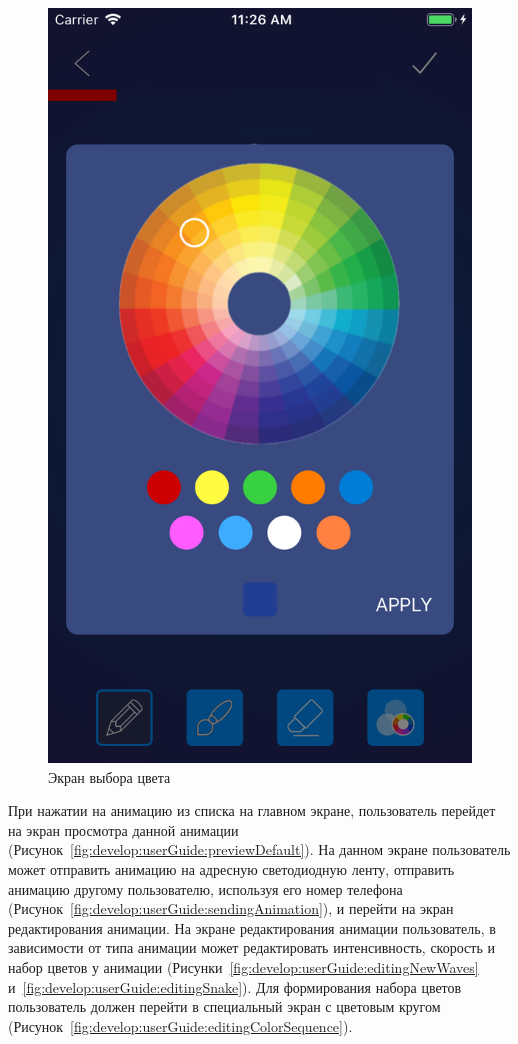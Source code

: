 \begin{figure}[H]
\centering
	\includegraphics[scale=0.2]{figures/userGuide/colorPicker.png}
	\caption{Экран выбора цвета}
	\label{fig:develop:userGuide:colorPicker}
\end{figure}
\vspace*{-1pt}
При нажатии на анимацию из списка на главном экране, пользователь перейдет на экран просмотра данной анимации (Рисунок~\ref{fig:develop:userGuide:previewDefault}). На данном экране пользователь может отправить анимацию на адресную светодиодную ленту, отправить анимацию другому пользователю, используя его номер телефона (Рисунок~\ref{fig:develop:userGuide:sendingAnimation}), и перейти на экран редактирования анимации. На экране редактирования анимации пользователь, в зависимости от типа анимации может редактировать интенсивность, скорость и набор цветов у анимации (Рисунки~\ref{fig:develop:userGuide:editingNewWaves} и~\ref{fig:develop:userGuide:editingSnake}). Для формирования набора цветов пользователь должен перейти в специальный экран с цветовым кругом (Рисунок~\ref{fig:develop:userGuide:editingColorSequence}).

